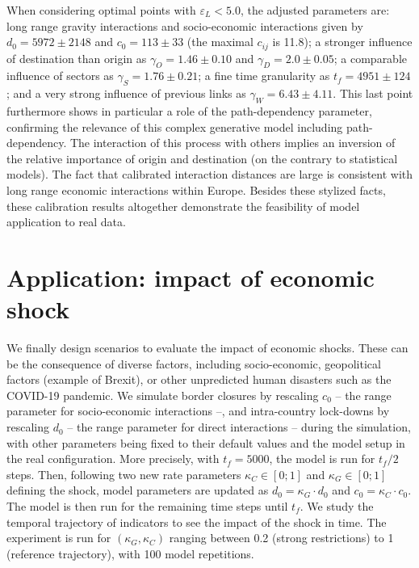 \documentclass[10pt,letterpaper]{article}
\begin{document}
When considering optimal points with $\varepsilon_L < 5.0$, the adjusted parameters are: long range gravity interactions and socio-economic interactions given by $d_0 = 5972 \pm 2148$ and $c_0 = 113 \pm 33$ (the maximal $c_{ij}$ is 11.8); a stronger influence of destination than origin as $\gamma_O = 1.46 \pm 0.10$ and $\gamma_D = 2.0 \pm 0.05$; a comparable influence of sectors as $\gamma_S = 1.76 \pm 0.21$; a fine time granularity as $t_f = 4951 \pm 124$; and a very strong influence of previous links as $\gamma_W = 6.43 \pm 4.11$. This last point furthermore shows in particular a role of the path-dependency parameter, confirming the relevance of this complex generative model including path-dependency. The interaction of this process with others implies an inversion of the relative importance of origin and destination (on the contrary to statistical models). The fact that calibrated interaction distances are large is consistent with long range economic interactions within Europe. Besides these stylized facts, these calibration results altogether demonstrate the feasibility of model application to real data.

\section*{Application: impact of economic shock}

We finally design scenarios to evaluate the impact of economic shocks. These can be the consequence of diverse factors, including socio-economic, geopolitical factors (example of Brexit), or other unpredicted human disasters such as the COVID-19 pandemic. We simulate border closures by rescaling $c_0$ -- the range parameter for socio-economic interactions --, and intra-country lock-downs by rescaling $d_0$ -- the range parameter for direct interactions -- during the simulation, with other parameters being fixed to their default values and the model setup in the real configuration. More precisely, with $t_f = 5000$, the model is run for $t_f / 2$ steps. Then, following two new rate parameters $\kappa_C \in \left[0;1\right]$ and $\kappa_G \in \left[0;1\right]$ defining the shock, model parameters are updated as $d_0 = \kappa_G \cdot d_0$ and $c_0 = \kappa_C \cdot c_0$. The model is then run for the remaining time steps until $t_f$. We study the temporal trajectory of indicators to see the impact of the shock in time. The experiment is run for $(\kappa_G,\kappa_C)$ ranging between 0.2 (strong restrictions) to 1 (reference trajectory), with 100 model repetitions.
\end{document}
